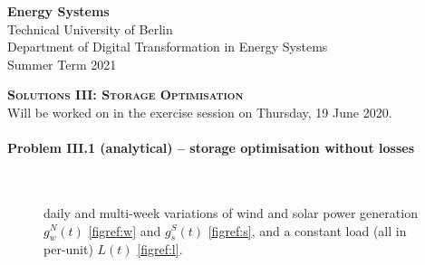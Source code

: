 \documentclass[11pt,a4paper,fleqn]{scrartcl}
\begin{document}
\begin{flushright}
      \textbf{Energy Systems}\\
      {\small Technical University of Berlin}\\
      {\small Department of Digital Transformation in Energy Systems}\\
      {\small Summer Term 2021}\\
\end{flushright}

 
 \vspace{-0.5em}
 \hrulefill
 \vspace{0.3em}

\begin{center}
 \textbf{\textsc{\Large Solutions III: Storage Optimisation}}\\
 \small Will be worked on in the exercise session on Thursday, 19 June 2020.\\[1.5em]
\end{center}

\vspace{-0.5em}
\hrulefill
\vspace{0.8em}

\paragraph{Problem III.1 (analytical) -- storage optimisation without losses}~\\

\begin{wrapfigure}[11]{r}{0pt}
 \caption{daily and multi-week variations of wind and solar power generation
	\(g^{N}_{w}(t)\)
	\autoref{figref:w} and \(g^{S}_{s}(t)\)
	\autoref{figref:s}, and a constant load (all in per-unit) \(L(t)\)
	\autoref{figref:l}.}
\label{fig:variations}
\end{wrapfigure}
\end{document}
